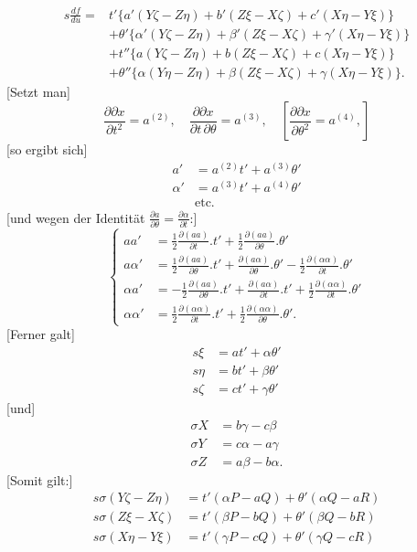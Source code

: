 %
\[
\begin{aligned}
s\frac{df}{du}={}&t'\{a'(Y\zeta-Z\eta)+b'(Z\xi-X\zeta)+c'(X\eta-Y\xi)\}\\
&+\theta'\{\alpha'(Y\zeta-Z\eta)+\beta'(Z\xi-X\zeta)+\gamma'(X\eta-Y\xi)\}\\
&+t''\{a(Y\zeta-Z\eta)+b(Z\xi-X\zeta)+c(X\eta-Y\xi)\}\\
&+\theta''\{\alpha(Y\eta-Z\eta)+\beta(Z\xi-X\zeta)+\gamma(X\eta-Y\xi)\}.
\end{aligned}
\]
[Setzt man]
\[
\frac{\partial\partial x}{\partial t^2}=a^{(2)},\quad
\frac{\partial\partial x}{\partial t\,\partial\theta}=a^{(3)},\quad
\left[\frac{\partial\partial x}{\partial\theta^2}=a^{(4)},\right]
\]
[so ergibt sich]
\[
\begin{aligned}
a'&=a^{(2)}t'+a^{(3)}\theta'\\
\alpha'&=a^{(3)}t'+a^{(4)}\theta'\\
&\text{etc.}
\end{aligned}
\]
[und wegen der Identität $\frac{\partial a}{\partial\theta}=\frac{\partial\alpha}{\partial t}$:]
\begin{equation}\tag*{[15]}
\left\{\begin{aligned}
aa'&=\tfrac12\frac{\partial(aa)}{\partial t}.t'+\tfrac12\frac{\partial(aa)}{\partial\theta}.\theta'\\
a\alpha'&=\tfrac12\frac{\partial(aa)}{\partial\theta}.t'+\frac{\partial(a\alpha)}{\partial\theta}.\theta'-\tfrac12\frac{\partial(\alpha\alpha)}{\partial t}.\theta'\\
\alpha a'&=-\tfrac12\frac{\partial(aa)}{\partial\theta}.t'+\frac{\partial(a\alpha)}{\partial t}.t'+\tfrac12\frac{\partial(\alpha\alpha)}{\partial t}.\theta'\\
\alpha\alpha'&=\tfrac12\frac{\partial(\alpha\alpha)}{\partial t}.t'+\tfrac12\frac{\partial(\alpha\alpha)}{\partial\theta}.\theta'.
\end{aligned}\right.
\end{equation}
[Ferner galt]
\[
\begin{aligned}s\xi&=at'+\alpha\theta'\\s\eta&=bt'+\beta\theta'\\s\zeta&=ct'+\gamma\theta'\end{aligned}
\]
[und]
\[
\begin{aligned}
\sigma X&=b\gamma-c\beta\\
\sigma Y&=c\alpha-a\gamma\\
\sigma Z&=a\beta-b\alpha.
\end{aligned}
\]
[Somit gilt:]
\[
\begin{aligned}
s\sigma(Y\zeta-Z\eta)&=t'(\alpha P-aQ)+\theta'(\alpha Q-aR)\\
s\sigma(Z\xi-X\zeta)&=t'(\beta P-bQ)+\theta'(\beta Q-bR)\\
s\sigma(X\eta-Y\xi)&=t'(\gamma P-cQ)+\theta'(\gamma Q-cR)
\end{aligned}
\]
